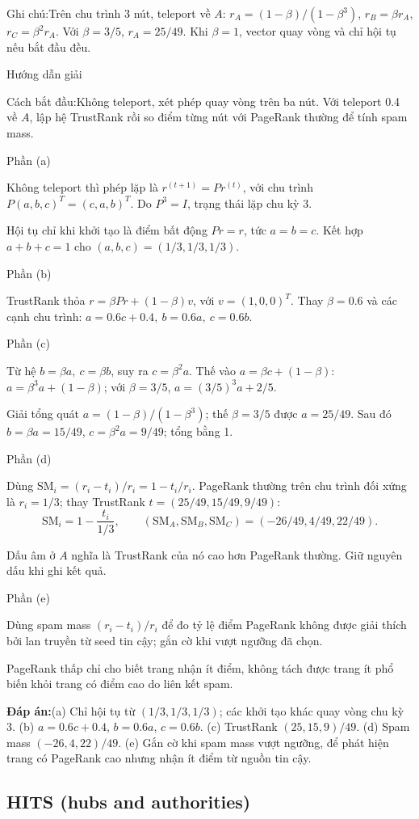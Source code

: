 \documentclass[10pt,a4paper,twocolumn]{article}
\makeatletter
\newcommand{\maptag}[1]{\phantomsection\@bsphack\protected@write\@auxout{}{\string\newlabel{#1}{{}{\thepage}{}{\@currentHref}{}}}\@esphack}
\newif\ifexamheadingprinted
\newcommand{\topic}[2]{%
  \global\examheadingprintedfalse\par\subsection{#2}\label{topic:#1}}
\newcommand{\key}[1]{#1:\enspace}
\newcommand{\solutionprompt}[1]{\par\addvspace{1pt}\noindent\key{Cách bắt đầu}#1\par\addvspace{2pt}}
\newcommand{\examnote}[1]{\par\addvspace{2pt}\noindent\key{Ghi chú}#1\par\addvspace{3pt}}
\newcommand{\blocklabel}[1]{\par\noindent#1\par\nobreak}
\newcommand{\answer}[1]{%
  \par\addvspace{3pt}%
  \blocklabel{#1Hướng dẫn giải}}
\newcommand{\finalanswer}[1]{%
  \par\addvspace{3pt}\noindent\textbf{Đáp án:}\nobreak\enspace#1\par}
\newcommand{\guidepart}[1]{%
  \par\addvspace{1.5pt}%
  \blocklabel{Phần #1}}
\makeatother
\begin{document}
\examnote{Trên chu trình 3 nút, teleport về $A$: $r_A=(1-\beta)/(1-\beta^3)$, $r_B=\beta r_A$, $r_C=\beta^2r_A$. Với $\beta=3/5$, $r_A=25/49$. Khi $\beta=1$, vector quay vòng và chỉ hội tụ nếu bắt đầu đều.}
\answer{\maptag{answer:P25-Q5}}
\solutionprompt{Không teleport, xét phép quay vòng trên ba nút. Với teleport 0.4 về $A$, lập hệ TrustRank rồi so điểm từng nút với PageRank thường để tính spam mass.}
\guidepart{(a)}
\begin{guidesteps}
\item Không teleport thì phép lặp là $r^{(t+1)}=Pr^{(t)}$, với chu trình $P(a,b,c)^T=(c,a,b)^T$. Do $P^3=I$, trạng thái lặp chu kỳ 3.
\item Hội tụ chỉ khi khởi tạo là điểm bất động $P r=r$, tức $a=b=c$. Kết hợp $a+b+c=1$ cho $(a,b,c)=(1/3,1/3,1/3)$.
\end{guidesteps}
\guidepart{(b)}
\begin{guidesteps}
\item TrustRank thỏa $r=\beta Pr+(1-\beta)v$, với $v=(1,0,0)^T$. Thay $\beta=0.6$ và các cạnh chu trình: $a=0.6c+0.4,\ b=0.6a,\ c=0.6b$.
\end{guidesteps}
\guidepart{(c)}
\begin{guidesteps}
\item Từ hệ $b=\beta a,\ c=\beta b$, suy ra $c=\beta^2a$. Thế vào $a=\beta c+(1-\beta)$: $a=\beta^3a+(1-\beta)$; với $\beta=3/5$, $a=(3/5)^3a+2/5$.
\item Giải tổng quát $a=(1-\beta)/(1-\beta^3)$; thế $\beta=3/5$ được $a=25/49$. Sau đó $b=\beta a=15/49$, $c=\beta^2a=9/49$; tổng bằng 1.
\end{guidesteps}
\guidepart{(d)}
\begin{guidesteps}
\item Dùng $\mathrm{SM}_i=(r_i-t_i)/r_i=1-t_i/r_i$. PageRank thường trên chu trình đối xứng là $r_i=1/3$; thay TrustRank $t=(25/49,15/49,9/49)$:
\[
\mathrm{SM}_i=1-\frac{t_i}{1/3},\qquad
(\mathrm{SM}_A,\mathrm{SM}_B,\mathrm{SM}_C)=(-26/49,4/49,22/49).
\]
\item Dấu âm ở $A$ nghĩa là TrustRank của nó cao hơn PageRank thường. Giữ nguyên dấu khi ghi kết quả.
\end{guidesteps}
\guidepart{(e)}
\begin{guidesteps}
\item Dùng spam mass $(r_i-t_i)/r_i$ để đo tỷ lệ điểm PageRank không được giải thích bởi lan truyền từ seed tin cậy; gắn cờ khi vượt ngưỡng đã chọn.
\item PageRank thấp chỉ cho biết trang nhận ít điểm, không tách được trang ít phổ biến khỏi trang có điểm cao do liên kết spam.
\end{guidesteps}
\finalanswer{(a) Chỉ hội tụ từ $(1/3,1/3,1/3)$; các khởi tạo khác quay vòng chu kỳ 3. (b) $a=0.6c+0.4$, $b=0.6a$, $c=0.6b$. (c) TrustRank $(25,15,9)/49$. (d) Spam mass $(-26,4,22)/49$. (e) Gắn cờ khi spam mass vượt ngưỡng, để phát hiện trang có PageRank cao nhưng nhận ít điểm từ nguồn tin cậy.}
\topic{hits}{HITS (hubs and authorities)}
\end{document}
